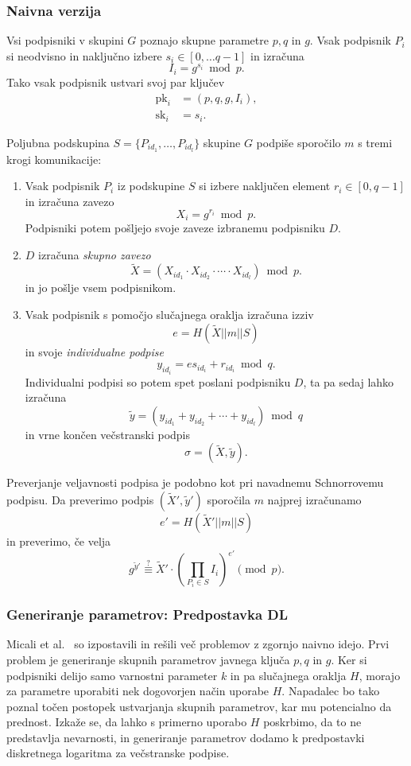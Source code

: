\documentclass[isrm2, tisk]{fmfdelo}
\begin{document}
\subsubsection{Naivna verzija}
Vsi podpisniki v skupini $G$ poznajo skupne parametre $p, q$ in $g$. Vsak podpisnik $P_i$ si 
neodvisno in naključno izbere $s_i \in [0, \dots q-1]$ in izračuna 
$$ 
I_i = g^{s_i} \bmod p.
$$
Tako vsak podpisnik ustvari svoj par ključev
\begin{align*}
    \text{pk}_i &= (p, q, g, I_i), \\
    \text{sk}_i &= s_i.
\end{align*}

Poljubna podskupina $S =\{P_{id_1}, \dots, P_{id_l}\}$ skupine $G$ podpiše sporočilo $m$ s tremi 
krogi komunikacije:
\begin{enumerate}
    \item Vsak podpisnik $P_i$ iz podskupine $S$ si izbere naključen element $r_i \in [0, q-1]$ 
        in izračuna zavezo 
        $$ 
        X_i = g^{r_i} \bmod p.
        $$
        Podpisniki potem pošljejo svoje zaveze izbranemu podpisniku $D$. 
    \item $D$ izračuna \textit{skupno zavezo} 
        $$ 
        \tilde{X} = (X_{id_1} \cdot X_{id_2} \cdot \cdots \cdot X_{id_l}) \bmod p.
        $$
        in jo pošlje vsem podpisnikom.
    \item Vsak podpisnik s pomočjo slučajnega oraklja izračuna izziv 
        $$ 
        e = H(\tilde{X} || m || S)
        $$
        in svoje \textit{individualne podpise} 
        $$ 
        y_{id_i} = e s_{id_i} + r_{id_i} \bmod q.
        $$
        Individualni podpisi so potem spet poslani podpisniku $D$, ta pa sedaj lahko 
        izračuna 
        $$ 
        \tilde{y} = (y_{id_1} + y_{id_2} + \cdots + y_{id_l}) \bmod q 
        $$
        in vrne končen večstranski podpis
        $$ 
        \sigma = (\tilde{X}, \tilde{y}).
        $$
\end{enumerate}

Preverjanje veljavnosti podpisa je podobno kot pri navadnemu Schnorrovemu podpisu. Da preverimo 
podpis $(\tilde{X}', \tilde{y}')$ sporočila $m$ najprej izračunamo 
$$ 
e' = H(\tilde{X}' || m || S)
$$ 
in preverimo, če velja 
$$
g^{\tilde{y}'} \stackrel{?}{\equiv} \tilde{X}' \cdot \left(\prod_{P_i \in S} I_i \right)^{e'} \pmod p.
$$

\subsubsection{Generiranje parametrov: Predpostavka DL}
Micali et al.~\cite{micali2001asm} so izpostavili in rešili več problemov z zgornjo naivno idejo. 
Prvi problem je generiranje skupnih parametrov javnega ključa $p, q$ in $g$. Ker si podpisniki 
delijo samo varnostni parameter $k$ in pa slučajnega oraklja $H$, morajo za parametre uporabiti 
nek dogovorjen način uporabe $H$. Napadalec bo tako poznal točen postopek ustvarjanja skupnih 
parametrov, kar mu potencialno da prednost. Izkaže se, da lahko s primerno uporabo $H$ poskrbimo, 
da to ne predstavlja nevarnosti, in generiranje parametrov dodamo k predpostavki diskretnega 
logaritma za večstranske podpise. 
\end{document}
